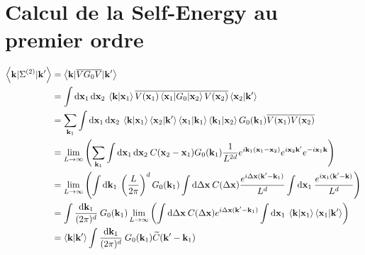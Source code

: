 \section{Calcul de la Self-Energy au premier ordre}
\begin{align}
\left\langle \mathbf{k} | \Sigma^{(2)} | \mathbf{k}' \right\rangle &= \left\langle \mathbf{k} | \overline{V G_0 V} | \mathbf{k}' \right\rangle \\
&= \int{ \mathop{}\mathopen{}\mathrm{d}\mathbf{x}_{\mathrm{1}} \mathop{}\mathopen{}\mathrm{d}\mathbf{x}_{\mathrm{2}} \: \left\langle \mathbf{k} | \mathbf{x}_{\mathrm{1}} \right\rangle \overline{V(\mathbf{x}_{\mathrm{1}}) \left\langle \mathbf{x}_{\mathrm{1}} | G_0 | \mathbf{x}_{\mathrm{2}}\right\rangle V(\mathbf{x}_{\mathrm{2}}) } \left\langle \mathbf{x}_{\mathrm{2}} |\mathbf{k}' \right\rangle} \\
&= \sum_{\mathbf{k}_{\mathrm{1}}}{\int{\mathop{}\mathopen{}\mathrm{d}\mathbf{x}_{\mathrm{1}} \mathop{}\mathopen{}\mathrm{d}\mathbf{x}_{\mathrm{2}} \: \left\langle \mathbf{k} |\mathbf{x}_{\mathrm{1}} \right\rangle \left\langle \mathbf{x}_{\mathrm{2}} | \mathbf{k}' \right\rangle \left\langle \mathbf{x}_{\mathrm{1}} | \mathbf{k}_{\mathrm{1}} \right\rangle \left\langle \mathbf{k}_{\mathrm{1}} | \mathbf{x}_{\mathrm{2}} \right\rangle G_0(\mathbf{k}_{\mathrm{1}})\overline{V(\mathbf{x}_{\mathrm{1}})V(\mathbf{x}_{\mathrm{2}})}}} \\
&= \lim\limits_{L\rightarrow\infty} \left( \sum_{\mathbf{k}_{\mathrm{1}}}{\int{\mathop{}\mathopen{}\mathrm{d}\mathbf{x}_{\mathrm{1}}\mathop{}\mathopen{}\mathrm{d}\mathbf{x}_{\mathrm{2}}\: C(\mathbf{x}_{\mathrm{2}}-\mathbf{x}_{\mathrm{1}}) G_0(\mathbf{k}_{\mathrm{1}}) \frac{1}{L^{2d}} e^{i \mathbf{k}_{\mathrm{1}}(\mathbf{x}_{\mathrm{1}}-\mathbf{x}_{\mathrm{2}})} e^{i \mathbf{x}_{\mathrm{2}} \mathbf{k}'} e^{-i \mathbf{x}_{\mathrm{1}} \mathbf{k}} }} \right) \\
&= \lim\limits_{L\rightarrow\infty} \left( \int{\mathop{}\mathopen{}\mathrm{d}\mathbf{k}_{\mathrm{1}} \: \left(\frac{L}{2\pi}\right)^d G_0(\mathbf{k}_{\mathrm{1}}) \int{\mathop{}\mathopen{}\mathrm{d}\Delta\mathbf{x} \: C(\Delta\mathbf{x}) \frac{e^{i \Delta\mathbf{x}(\mathbf{k}'-\mathbf{k}_{\mathrm{1}})}}{L^d}} \int{\mathop{}\mathopen{}\mathrm{d}\mathbf{x}_{\mathrm{1}} \: \frac{e^{i \mathbf{x}_{\mathrm{1}}(\mathbf{k}'-\mathbf{k})}}{L^d}} } \right) \\
&=\int{\frac{\mathop{}\mathopen{}\mathrm{d}\mathbf{k}_{\mathrm{1}}}{(2\pi)^d} \: G_0(\mathbf{k}_{\mathrm{1}}) \lim\limits_{L\rightarrow\infty}\left( \int{\mathop{}\mathopen{}\mathrm{d}\Delta\mathbf{x} \: C(\Delta\mathbf{x}) e^{i\Delta\mathbf{x}(\mathbf{k}'-\mathbf{k}_{\mathrm{1}})}} \int{\mathop{}\mathopen{}\mathrm{d}\mathbf{x}_{\mathrm{1}} \: \left\langle \mathbf{k} | \mathbf{x}_{\mathrm{1}}\right\rangle \left\langle \mathbf{x}_{\mathrm{1}} | \mathbf{k}' \right\rangle } \right)} \\
&= \left\langle \mathbf{k} | \mathbf{k}' \right\rangle \int{\frac{\mathop{}\mathopen{}\mathrm{d}\mathbf{k}_{\mathrm{1}}}{(2\pi)^d} \: G_0(\mathbf{k}_{\mathrm{1}}) \widetilde{C}(\mathbf{k}'-\mathbf{k}_{\mathrm{1}})}
\end{align}









